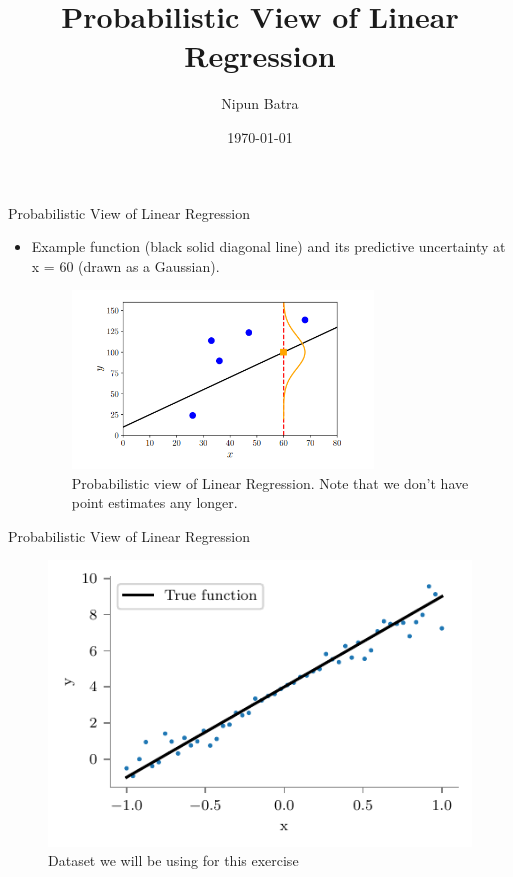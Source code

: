 \documentclass{beamer}
\title{Probabilistic View of Linear Regression}
\date{\today}
\author{Nipun Batra}
\institute{IIT Gandhinagar}
\begin{document}
	
	\maketitle
	\begin{frame}{Probabilistic View of Linear Regression}
	\begin{itemize}[<+->]
		\item  Example
		function (black solid
		diagonal line) and
		its predictive
		uncertainty at
		x = 60 (drawn as a
		Gaussian). 
		\begin{figure}[htp]
			\centering
			\includegraphics[width=8cm]{figures/probabilisticview.png}
			\caption{Probabilistic view of Linear Regression. Note that we don't have point estimates any longer.}
			\label{fig:prob1}
		\end{figure}
	\end{itemize}
\end{frame}

\begin{frame}{Probabilistic View of Linear Regression}
\begin{figure}
	\centering
	\includegraphics{../../notebooks/bayesian-linear-dataset}
	\caption{Dataset we will be using for this exercise}
	\label{fig:bayesian-linear-dataset}
\end{figure}

\end{frame}
\end{document}
